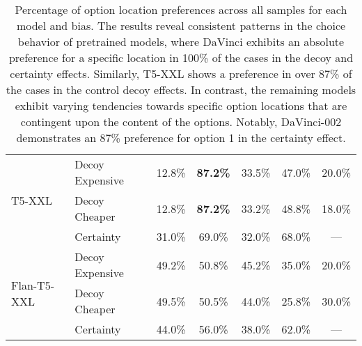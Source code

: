 \begin{table*}[th!]
\begin{tabular}{@{}llcc|c  cc@{}}
\multirow{3}{*}{ \hspace{0.5cm} T5-XXL} 
 & Decoy Expensive &                            12.8\% &                            \textbf{87.2\%} &       33.5\% &                       47.0\% &                       20.0\% \\
 &   Decoy Cheaper &                            12.8\% &                           \textbf{ 87.2\%} &            33.2\% &                       48.8\% &                       18.0\% \\
 &       Certainty &                    31.0\% &                        69.0\% &                       32.0\% &                       68.0\% &                       --- \\

\midrule

\multirow{3}{*}{ \hspace{0.1cm} Flan-T5-XXL} 
 & Decoy Expensive &                            49.2\% &                            50.8\% &        45.2\% &                       35.0\% &                       20.0\% \\
 &   Decoy Cheaper &                            49.5\% &                            50.5\% &         44.0\% &                       25.8\% &                       30.0\% \\
 &       Certainty &                   44.0\% &                        56.0\% &                       38.0\% &                       62.0\% &                       --- \\
\bottomrule

\bottomrule
\end{tabular}
\caption{ Percentage of option location preferences across all samples for each model and bias.
The results reveal consistent patterns in the choice behavior of pretrained models, where DaVinci exhibits an absolute preference for a specific location in 100\% of the cases in the decoy and certainty effects. Similarly, T5-XXL shows a preference in over 87\% of the cases in the control decoy effects. In contrast, the remaining models exhibit varying tendencies towards specific option locations that are contingent upon the content of the options. Notably, DaVinci-002 demonstrates an 87\% preference for option 1 in the certainty effect.}
\label{tab:options_locations}
\end{table*}